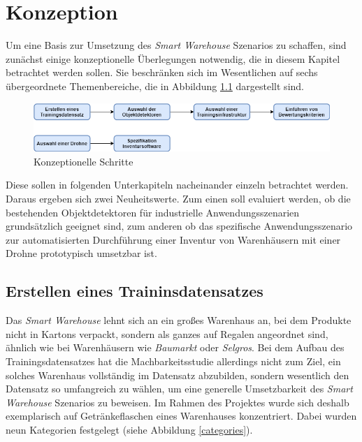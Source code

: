 \chapter{Konzeption}

Um eine Basis zur Umsetzung des \textit{Smart Warehouse} Szenarios zu schaffen, sind zunächst einige konzeptionelle Überlegungen notwendig, die in diesem Kapitel betrachtet werden sollen. Sie beschränken sich im Wesentlichen auf sechs übergeordnete Themenbereiche, die in Abbildung \ref{schritte} dargestellt sind. 

\begin{figure}[ht]
	\begin{center}
		\includegraphics[width=15cm]{Bilder/blockdiagramm.png} 
		\caption[Konzeptionelle Schritte]{Konzeptionelle Schritte}
		\label{schritte}
	\end{center}
\end{figure}

Diese sollen in folgenden Unterkapiteln nacheinander einzeln betrachtet werden. Daraus ergeben sich zwei Neuheitswerte. Zum einen soll evaluiert werden, ob die bestehenden Objektdetektoren für industrielle Anwendungsszenarien grundsätzlich geeignet sind, zum anderen ob das spezifische Anwendungsszenario zur automatisierten Durchführung einer Inventur von Warenhäusern mit einer Drohne prototypisch umsetzbar ist.

\section{Erstellen eines Traininsdatensatzes}

Das \textit{Smart Warehouse} lehnt sich an ein großes Warenhaus an, bei dem Produkte nicht in Kartons verpackt, sondern als ganzes auf Regalen angeordnet sind, ähnlich wie bei Warenhäusern wie \textit{Baumarkt} oder \textit{Selgros}. Bei dem Aufbau des Trainingsdatensatzes hat die Machbarkeitsstudie allerdings nicht zum Ziel, ein solches Warenhaus vollständig im Datensatz abzubilden, sondern wesentlich den Datensatz so umfangreich zu wählen, um eine generelle Umsetzbarkeit des \textit{Smart Warehouse} Szenarios zu beweisen. Im Rahmen des Projektes wurde sich deshalb exemplarisch auf Getränkeflaschen eines Warenhauses konzentriert. Dabei wurden neun Kategorien festgelegt (siehe Abbildung \ref{categories}). 

